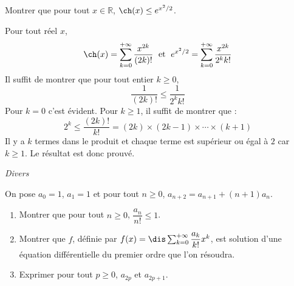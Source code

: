 \documentclass[a4paper,10pt]{report}
\begin{document}
\begin{Exa} Montrer que pour tout $x \in \mathbb{R}$, $\ch(x) \leq e^{x^2/2}$.
\end{Exa}

\corr Pour tout réel $x$,
$$ \ch(x) = \sum_{k=0}^{+ \infty} \dfrac{x^{2k}}{(2k)!} \; \hbox{ et } \; e^{x^2/2} = \sum_{k=0}^{+ \infty} \dfrac{x^{2k}}{2^k k!}$$
Il suffit de montrer que pour tout entier $k \geq 0$,
$$ \dfrac{1}{(2k)!} \leq \dfrac{1}{2^k	k!}$$
Pour $k=0$ c'est évident. Pour $k \geq 1$, il suffit de montrer que :
$$ 2^k \leq \dfrac{(2k)!}{k!} = (2k) \times (2k-1) \times \cdots \times (k+1)$$
Il y a $k$ termes dans le produit et chaque terme est supérieur ou égal à $2$ car $k \geq 1$. Le résultat est donc prouvé.

\medskip

\begin{center}
\textit{{ {\large Divers}}}
\end{center}

\medskip


\begin{Exa} On pose $a_0=1$, $a_1=1$ et pour tout $n \geq 0$, $a_{n+2} = a_{n+1} + (n+1)a_n$.
\begin{enumerate}
\item Montrer que pour tout $n \geq 0$, $\dfrac{a_n}{n!} \leq 1$.
\item Montrer que $f$, définie par $f(x) = \dis \sum_{k=0}^{+ \infty} \dfrac{a_k}{k!}x^k$, est solution d'une équation différentielle du premier ordre que l'on résoudra.
\item Exprimer pour tout $p \geq 0$, $a_{2p}$ et $a_{2p+1}$.
\end{enumerate}
\end{Exa}
\end{document}
